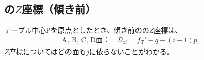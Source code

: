 \subsection{\Dimple の\texorpdfstring{$Z$}{Z}座標（傾き前）}
テーブル中心Pを原点としたとき、傾き前の\DimpleIRowJ の$Z$座標は、
\begin{align}
  \label{eq:dPosZBefore}
  \text{A, B, C, D面：}\quad
  \mathcal D_{zi} = f_\mathrm T'-q-(i-1)p_z
\end{align}
$Z$座標についてはどの面も$j$に依らないことがわかる。


